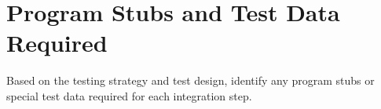 \section{Program Stubs and Test Data Required}

Based on the testing strategy and test design, identify any program stubs or special test data required for each integration step.
